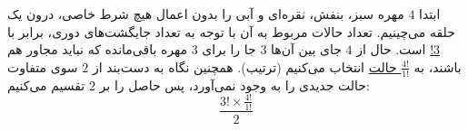 \p
ابتدا 
$4$
مهره سبز، بنفش، نقره‌ای و آبی را بدون اعمال هیچ شرط خاصی، درون یک حلقه می‌چینیم. تعداد حالات مربوط به آن با توجه به تعداد جایگشت‌ها‌ی دوری، برابر با
\underline{3!}
است.
حال از
$4$
  جای بین آن‌ها 
$3$
   جا را برای 
$3$
    مهره باقی‌مانده که نباید مجاور هم باشند، به
    \underline{$\frac{4!}{1!}$ حالت}
    انتخاب می‌کنیم
     (ترتیب).
      همچنین نگاه به دست‌بند از
$2$
    سوی متفاوت حالت جدیدی را به وجود نمی‌آورد، پس حاصل را بر 
$2$
    تقسیم می‌کنیم:
    $$\frac{3!\times \frac{4!}{1!}}{2}$$
